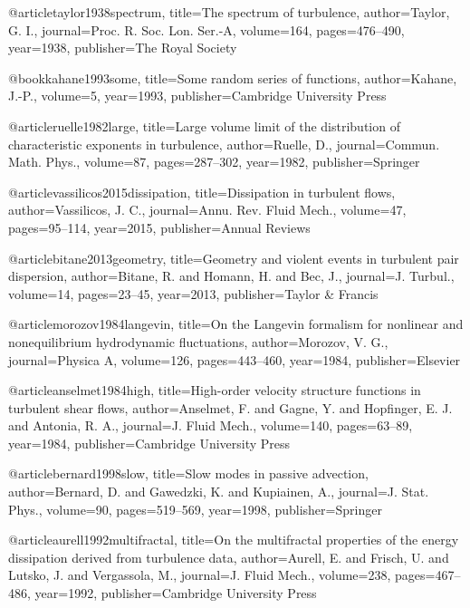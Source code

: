   @article{taylor1938spectrum,
    title={{The spectrum of turbulence}},
    author={Taylor, G. I.},
    journal={Proc. R. Soc. Lon. Ser.-A},
    volume={164},
    pages={476--490},
    year={1938},
    publisher={The Royal Society}
  }

  @book{kahane1993some,
    title={{Some random series of functions}},
    author={Kahane, J.-P.},
    volume={5},
    year={1993},
    publisher={Cambridge University Press}
  }

  @article{ruelle1982large,
    title={{Large volume limit of the distribution of characteristic exponents in turbulence}},
    author={Ruelle, D.},
    journal={Commun. Math. Phys.},
    volume={87},
    pages={287--302},
    year={1982},
    publisher={Springer}
  }

  @article{vassilicos2015dissipation,
    title={{Dissipation in turbulent flows}},
    author={Vassilicos, J. C.},
    journal={Annu. Rev. Fluid Mech.},
    volume={47},
    pages={95--114},
    year={2015},
    publisher={Annual Reviews}
  }

  @article{bitane2013geometry,
    title={{Geometry and violent events in turbulent pair dispersion}},
    author={Bitane, R. and Homann, H. and Bec, J.},
    journal={J. Turbul.},
    volume={14},
    pages={23--45},
    year={2013},
    publisher={Taylor \& Francis}
  }

  @article{morozov1984langevin,
    title={{On the Langevin formalism for nonlinear and nonequilibrium hydrodynamic fluctuations}},
    author={Morozov, V. G.},
    journal={Physica A},
    volume={126},
    pages={443--460},
    year={1984},
    publisher={Elsevier}
  }

  @article{anselmet1984high,
    title={{High-order velocity structure functions in turbulent shear flows}},
    author={Anselmet, F. and Gagne, Y. and Hopfinger, E. J. and Antonia, R. A.},
    journal={J. Fluid Mech.},
    volume={140},
    pages={63--89},
    year={1984},
    publisher={Cambridge University Press}
  }

  @article{bernard1998slow,
    title={{Slow modes in passive advection}},
    author={Bernard, D. and Gawedzki, K. and Kupiainen, A.},
    journal={J. Stat. Phys.},
    volume={90},
    pages={519--569},
    year={1998},
    publisher={Springer}
  }

  @article{aurell1992multifractal,
    title={{On the multifractal properties of the energy dissipation derived from turbulence data}},
    author={Aurell, E. and Frisch, U. and Lutsko, J. and Vergassola, M.},
    journal={J. Fluid Mech.},
    volume={238},
    pages={467--486},
    year={1992},
    publisher={Cambridge University Press}
  }

